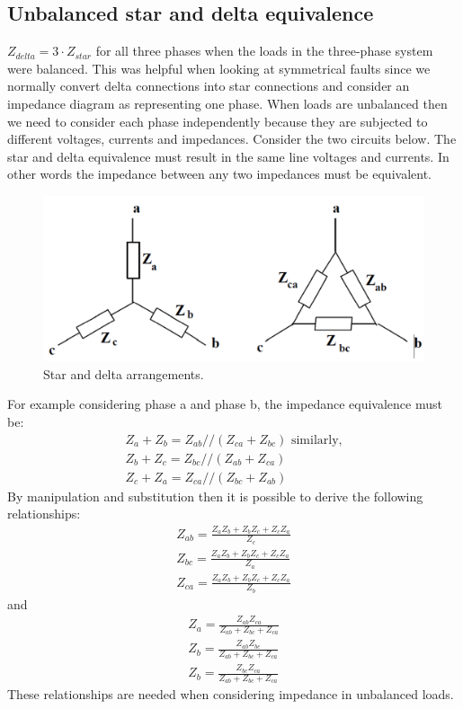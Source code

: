 \documentclass[class=report, crop=false, 12pt,a4paper]{standalone}
\begin{document}
\subsection{Unbalanced star and delta equivalence}
$Z_{delta} = 3\cdot Z_{star}$ for all three phases when the loads in the three-phase system were balanced. This was helpful when looking at symmetrical faults since we normally convert delta connections into star connections and consider an impedance diagram as representing one phase. When loads are unbalanced then we need to consider each phase independently because they are subjected to different voltages, currents and impedances. Consider the two circuits below. The star and delta equivalence must result in the same line voltages and currents. In other words the impedance between any two impedances must be equivalent.
\begin{figure}[H]
	\centering
	\includegraphics[width = \textwidth]{../img/figure31.png}
	\caption{Star and delta arrangements.}
\end{figure}
For example considering phase a and phase b, the impedance equivalence must be:
\begin{gather}
	Z_a + Z_b = Z_{ab} // \left(Z_{ca}+Z_{bc}\right) \textrm{ similarly,}\\
	Z_b + Z_c = Z_{bc} // \left(Z_{ab}+Z_{ca}\right)\\
	Z_c + Z_a = Z_{ca} // \left(Z_{bc}+Z_{ab}\right)
\end{gather}
By manipulation and substitution then it is possible to derive the following relationships:
\begin{gather}
	Z_{ab} = \frac{Z_aZ_b + Z_bZ_c+Z_cZ_a}{Z_c}\\
	Z_{bc} = \frac{Z_aZ_b + Z_bZ_c+Z_cZ_a}{Z_a}\\
	Z_{ca} = \frac{Z_aZ_b + Z_bZ_c+Z_cZ_a}{Z_b}
\end{gather}
and
\begin{gather}
	Z_a = \frac{Z_{ab}Z_{ca}}{Z_{ab}+Z_{bc}+Z_{ca}}\\
	Z_b = \frac{Z_{ab}Z_{bc}}{Z_{ab}+Z_{bc}+Z_{ca}}\\
	Z_b = \frac{Z_{bc}Z_{ca}}{Z_{ab}+Z_{bc}+Z_{ca}}
\end{gather}
These relationships are needed when considering impedance in unbalanced loads.
\end{document}
